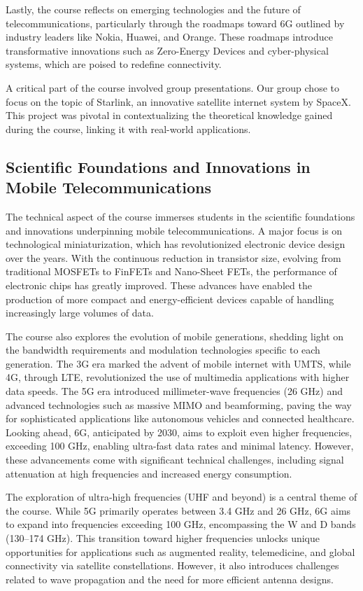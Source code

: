 Lastly, the course reflects on emerging technologies and the future of telecommunications, particularly through the roadmaps toward 6G outlined by industry leaders like Nokia, Huawei, and Orange. These roadmaps introduce transformative innovations such as Zero-Energy Devices and cyber-physical systems, which are poised to redefine connectivity.

A critical part of the course involved group presentations. Our group chose to focus on the topic of Starlink, an innovative satellite internet system by SpaceX. This project was pivotal in contextualizing the theoretical knowledge gained during the course, linking it with real-world applications.
\subsection{Scientific Foundations and Innovations in Mobile Telecommunications}

The technical aspect of the course immerses students in the scientific foundations and innovations underpinning mobile telecommunications. A major focus is on technological miniaturization, which has revolutionized electronic device design over the years. With the continuous reduction in transistor size, evolving from traditional MOSFETs to FinFETs and Nano-Sheet FETs, the performance of electronic chips has greatly improved. These advances have enabled the production of more compact and energy-efficient devices capable of handling increasingly large volumes of data.

The course also explores the evolution of mobile generations, shedding light on the bandwidth requirements and modulation technologies specific to each generation. The 3G era marked the advent of mobile internet with UMTS, while 4G, through LTE, revolutionized the use of multimedia applications with higher data speeds. The 5G era introduced millimeter-wave frequencies (26 GHz) and advanced technologies such as massive MIMO and beamforming, paving the way for sophisticated applications like autonomous vehicles and connected healthcare. Looking ahead, 6G, anticipated by 2030, aims to exploit even higher frequencies, exceeding 100 GHz, enabling ultra-fast data rates and minimal latency. However, these advancements come with significant technical challenges, including signal attenuation at high frequencies and increased energy consumption.

The exploration of ultra-high frequencies (UHF and beyond) is a central theme of the course. While 5G primarily operates between 3.4 GHz and 26 GHz, 6G aims to expand into frequencies exceeding 100 GHz, encompassing the W and D bands (130–174 GHz). This transition toward higher frequencies unlocks unique opportunities for applications such as augmented reality, telemedicine, and global connectivity via satellite constellations. However, it also introduces challenges related to wave propagation and the need for more efficient antenna designs.

